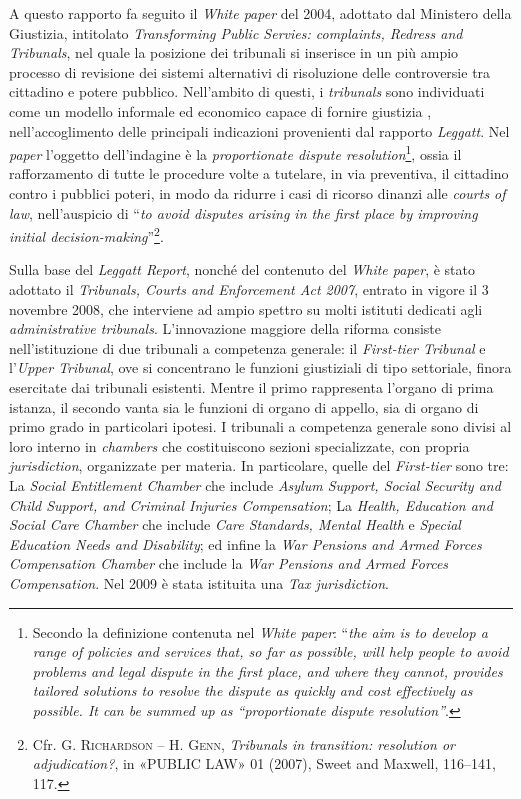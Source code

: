 \documentclass[12pt,it,a4paper,]{report}
\begin{document}
A questo rapporto fa seguito il \emph{White paper} del 2004, adottato
dal Ministero della Giustizia, intitolato \emph{Transforming Public
Servies: complaints, Redress and Tribunals}, nel quale la posizione dei
tribunali si inserisce in un più ampio processo di revisione dei sistemi
alternativi di risoluzione delle controversie tra cittadino e potere
pubblico. Nell'ambito di questi, i \emph{tribunals} sono individuati
come un modello informale ed economico capace di fornire giustizia ,
nell'accoglimento delle principali indicazioni provenienti dal rapporto
\emph{Leggatt}. Nel \emph{paper} l'oggetto dell'indagine è la
\emph{proportionate dispute resolution}\footnote{Secondo la definizione
  contenuta nel \emph{White paper}: ``\emph{the aim is to develop a
  range of policies and services that, so far as possible, will help
  people to avoid problems and legal dispute in the first place, and
  where they cannot, provides tailored solutions to resolve the dispute
  as quickly and cost effectively as possible. It can be summed up as
  ``proportionate dispute resolution''}.}, ossia il rafforzamento di
tutte le procedure volte a tutelare, in via preventiva, il cittadino
contro i pubblici poteri, in modo da ridurre i casi di ricorso dinanzi
alle \emph{courts of law}, nell'auspicio di ``\emph{to avoid disputes
arising in the first place by improving initial
decision-making}''\footnote{Cfr. G. \textsc{Richardson} -- H.
  \textsc{Genn}, \emph{Tribunals in transition: resolution or
  adjudication?}, in {«PUBLIC LAW»} 01 (2007), Sweet and Maxwell,
  116--141, 117.}.

Sulla base del \emph{Leggatt Report}, nonché del contenuto del
\emph{White paper}, è stato adottato il \emph{Tribunals, Courts and
Enforcement Act 2007}, entrato in vigore il 3 novembre 2008, che
interviene ad ampio spettro su molti istituti dedicati agli
\emph{administrative tribunals}. L'innovazione maggiore della riforma
consiste nell'istituzione di due tribunali a competenza generale: il
\emph{First-tier Tribunal} e l'\emph{Upper Tribunal}, ove si concentrano
le funzioni giustiziali di tipo settoriale, finora esercitate dai
tribunali esistenti. Mentre il primo rappresenta l'organo di prima
istanza, il secondo vanta sia le funzioni di organo di appello, sia di
organo di primo grado in particolari ipotesi. I tribunali a competenza
generale sono divisi al loro interno in \emph{chambers} che
costituiscono sezioni specializzate, con propria \emph{jurisdiction},
organizzate per materia. In particolare, quelle del \emph{First-tier}
sono tre: La \emph{Social Entitlement Chamber} che include \emph{Asylum
Support, Social Security and Child Support, and Criminal Injuries
Compensation}; La \emph{Health, Education and Social Care Chamber} che
include \emph{Care Standards, Mental Health} e \emph{Special Education
Needs and Disability}; ed infine la \emph{War Pensions and Armed Forces
Compensation Chamber} che include la \emph{War Pensions and Armed Forces
Compensation}. Nel 2009 è stata istituita una \emph{Tax jurisdiction}.
\end{document}
